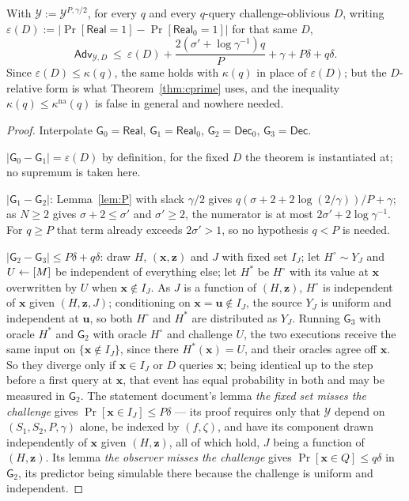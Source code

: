 \documentclass{aicr-solution}
\newcommand{\Adv}{\mathsf{Adv}}
\newcommand{\Real}{\mathsf{Real}}
\newcommand{\Dec}{\mathsf{Dec}}
\newcommand{\Prob}[1]{\Pr\!\left[#1\right]}
\newcommand{\vx}{\mathbf{x}}
\newcommand{\vz}{\mathbf{z}}
\newcommand{\vu}{\mathbf{u}}
\newcommand{\kna}{\kappa^{\mathrm{na}}}
\begin{document}
\begin{theorem}\label{thm:C}
With $\mathcal Y:=\mathcal Y^{P,\gamma/2}$, for every $q$ and every $q$-query
challenge-oblivious $D$, writing
$\varepsilon(D):=\bigl|\Prob{\Real=1}-\Prob{\Real_0=1}\bigr|$ for that same $D$,
\[
  \Adv_{\mathcal Y,D}\ \le\ \varepsilon(D)
  +\frac{2(\sigma'+\log\gamma^{-1})q}{P}+\gamma+P\delta+q\delta .
\]
Since $\varepsilon(D)\le\kappa(q)$, the same holds with $\kappa(q)$ in place of
$\varepsilon(D)$; but the $D$-relative form is what Theorem~\ref{thm:cprime}
uses, and the inequality $\kappa(q)\le\kna(q)$ is false in general and nowhere
needed.
\end{theorem}

\begin{proof}
Interpolate $\mathsf G_0=\Real$, $\mathsf G_1=\Real_0$, $\mathsf G_2=\Dec_0$,
$\mathsf G_3=\Dec$.

$|\mathsf G_0-\mathsf G_1|=\varepsilon(D)$ by definition, for the fixed $D$ the
theorem is instantiated at; no supremum is taken here.

$|\mathsf G_1-\mathsf G_2|$: Lemma~\ref{lem:P} with slack $\gamma/2$ gives
$q(\sigma+2+2\log(2/\gamma))/P+\gamma$; as $N\ge2$ gives $\sigma+2\le\sigma'$ and
$\sigma'\ge2$, the numerator is at most $2\sigma'+2\log\gamma^{-1}$. For $q\ge P$
that term already exceeds $2\sigma'>1$, so no hypothesis $q<P$ is needed.

$|\mathsf G_2-\mathsf G_3|\le P\delta+q\delta$: draw $H$, $(\vx,\vz)$ and $J$
with fixed set $I_J$; let $H^{\circ}\sim Y_J$ and $U\leftarrow[M]$ be independent of
everything else; let $H^{*}$ be $H^{\circ}$ with its value at $\vx$ overwritten by
$U$ when $\vx\notin I_J$. As $J$ is a function of $(H,\vz)$, $H^{\circ}$ is
independent of $\vx$ given $(H,\vz,J)$; conditioning on $\vx=\vu\notin I_J$, the
source $Y_J$ is uniform and independent at $\vu$, so both $H^{\circ}$ and
$H^{*}$ are distributed as $Y_J$. Running $\mathsf G_3$ with oracle $H^{*}$ and
$\mathsf G_2$ with oracle $H^{\circ}$ and challenge $U$, the two executions
receive the same input on $\{\vx\notin I_J\}$, since there $H^{*}(\vx)=U$, and
their oracles agree off $\vx$. So they diverge only if $\vx\in I_J$ or $D$ queries
$\vx$; being identical up to the step before a first query at $\vx$, that event
has equal probability in both and may be measured in $\mathsf G_2$. The statement
document's lemma \emph{the fixed set misses the challenge} gives
$\Prob{\vx\in I_J}\le P\delta$ --- its proof requires only that $\mathcal Y$
depend on $(S_1,S_2,P,\gamma)$ alone, be indexed by $(f,\zeta)$, and have its
component drawn independently of $\vx$ given $(H,\vz)$, all of which hold, $J$
being a function of $(H,\vz)$. Its lemma \emph{the observer misses the challenge}
gives $\Prob{\vx\in Q}\le q\delta$ in $\mathsf G_2$, its predictor being
simulable there because the challenge is uniform and independent.
\end{proof}
\end{document}
